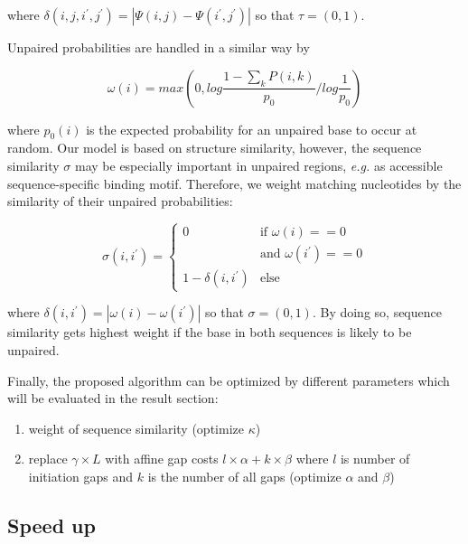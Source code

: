 \documentclass[a4paper,twoside]{article}
\newcommand\eg{\textit{e.g.}}
\begin{document}
where $\delta(i,j,i^\prime,j^\prime) = | \Psi(i,j) - \Psi(i^\prime,j^\prime) |$
so that $\tau = (0,1)$. 

Unpaired probabilities are handled in a similar way by

\begin{equation}
	\omega(i) = max \left( 0, log \frac{1 - \sum_k P(i,k)}{p_0} / log \frac{1}{p_0} \right)
\end{equation}

where $p_0(i)$ is the expected probability for an unpaired base to occur at
random. Our model is based on structure similarity, however, the sequence
similarity $\sigma$ may be especially important in unpaired regions, \eg{} as
accessible sequence-specific binding motif.  Therefore, we weight matching
nucleotides by the similarity of their unpaired probabilities:

\begin{equation}
	\sigma(i,i^\prime) = \left\{ \begin{array}{cl}
			0 & \textrm{if } \omega(i) == 0 \\
			  & \textrm{and } \omega(i^\prime ) == 0 \\
			1 - \delta(i,i^\prime) & \textrm{else}
		\end{array}\right.
\end{equation}

where $\delta(i,i^\prime) = | \omega(i) - \omega(i^\prime) |$ so that $\sigma = (0,1)$.  By
doing so, sequence similarity gets highest weight if the base in both sequences
is likely to be unpaired.

Finally, the proposed algorithm can be optimized by different parameters which
will be evaluated in the result section:

\begin{enumerate}
\item weight of sequence similarity (optimize $\kappa$)
\item replace $\gamma \times L$ with affine gap costs $l \times \alpha + k
\times \beta$ where $l$ is number of initiation gaps and $k$ is the number of
all gaps (optimize $\alpha$ and $\beta$)
\end{enumerate}


\subsection{Speed up}
\end{document}
